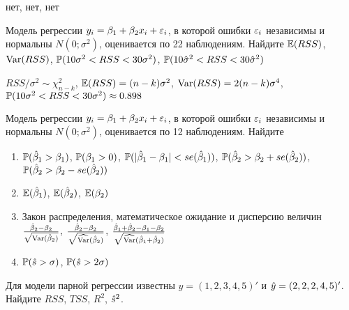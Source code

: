 \documentclass[pdftex,11pt,openany]{book}
\begin{document}
\begin{solution}
нет, нет, нет 
\end{solution}



\begin{problem}
 Модель регрессии $y_i = \beta_1 + \beta_2 x_i + \e_i$, в которой ошибки
$\e_i$ независимы и нормальны $N(0;\sigma^2)$, оценивается по 22 наблюдениям. Найдите $\E(RSS)$, $\Var(RSS)$, $\P(10\sigma^2<RSS<30\sigma^2)$, $\P(10\hat{\sigma}^2<RSS<30\hat{\sigma}^2)$
\end{problem}

\begin{solution}
 $RSS/\sigma^2\sim\chi^2_{n-k}$, $\E(RSS)=(n-k)\sigma^2$, $\Var(RSS)=2(n-k)\sigma^4$, $\P(10\sigma^2<RSS<30\sigma^2)\approx 0.898$ 
\end{solution}


\begin{problem}
 Модель регрессии $y_i = \beta_1 + \beta_2 x_i + \e_i$, в которой ошибки
$\e_i$ независимы и нормальны $N(0;\sigma^2)$, оценивается по 12 наблюдениям. Найдите
\begin{enumerate}
\item $\P(\hb_1>\beta_1)$, $\P(\beta_1>0)$, $\P(|\hb_1-\beta_1|<se(\hb_1))$, $\P(\hb_2>\beta_2+se(\hb_2))$, $\P(\hb_2>\beta_2-se(\hb_2))$
\item $\E(\hb_1)$, $\E(\hb_2)$, $\E(\beta_2)$
\item Закон распределения, математическое ожидание и дисперсию величин $\frac{\hb_2-\beta_2}{\sqrt{\Var(\hb_2)}}$, $\frac{\hb_2-\beta_2}{\sqrt{\widehat{\Var}(\hb_2)}}$, $\frac{\hb_1+\hb_2-\beta_1-\beta_2}{\sqrt{\widehat{\Var}(\hb_1+\hb_2)}}$
\item $\P(\hs>\sigma)$, $\P(\hs>2\sigma)$
\end{enumerate}

\end{problem}

\begin{solution}
\end{solution}



\begin{problem}
 Для модели парной регрессии известны $y=(1, 2, 3, 4, 5)'$ и $\hy=(2, 2, 2, 4, 5)'$. Найдите $RSS$, $TSS$, $R^2$, $\hs^2$.
\end{problem}

\begin{solution}
\end{solution}
\end{document}
